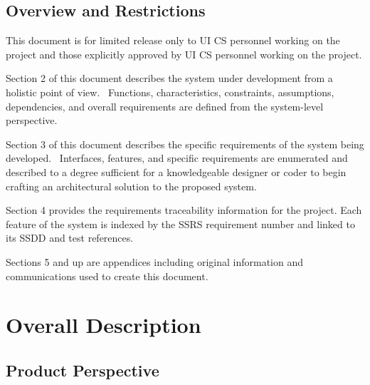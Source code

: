 \documentclass[twoside,letterpaper]{article}
\begin{document}
\subsection{Overview and Restrictions}
This document is for limited release only to UI CS personnel working on
the project and those explicitly approved by UI CS personnel working on the project.

Section 2 of this document describes the system under development from a
holistic point of view. \ Functions, characteristics, constraints,
assumptions, dependencies, and overall requirements are defined from
the system-level perspective.

Section 3 of this document describes the specific requirements of the
system being developed. \ Interfaces, features, and specific
requirements are enumerated and described to a degree sufficient for a
knowledgeable designer or coder to begin crafting an architectural
solution to the proposed system.

Section 4 provides the requirements traceability information for the
project.  Each feature of the system is indexed by the SSRS
requirement number and linked to its SSDD and test references.

Sections 5 and up are appendices including original information and
communications used to create this document.



\section{Overall Description}

\subsection{Product Perspective}
\end{document}
